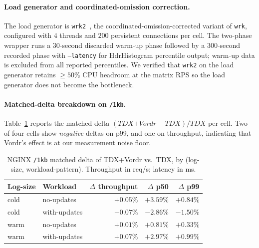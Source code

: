 \paragraph{Load generator and coordinated-omission correction.}
The load generator is \texttt{wrk2}~\cite{wrk2}, the
coordinated-omission-corrected variant of \texttt{wrk}, configured
with $4$ threads and $200$ persistent connections per cell. The
two-phase wrapper runs a $30$-second discarded warm-up phase followed
by a $300$-second recorded phase with \texttt{--latency} for HdrHistogram
percentile output; warm-up data is excluded from all reported
percentiles. We verified that \texttt{wrk2} on the load generator
retains $\geq{}50\%$ CPU headroom at the matrix RPS so the load
generator does not become the bottleneck.

\paragraph{Matched-delta breakdown on \texttt{/1kb}.}
Table~\ref{tab:nginx-matched} reports the matched-delta
$(\textit{TDX+Vordr} - \textit{TDX})/\textit{TDX}$ per cell. Two of
four cells show \emph{negative} deltas on p99, and one on throughput,
indicating that Vordr's effect is at our measurement noise floor.

\begin{table}[t]
\centering
\small
\caption{NGINX \texttt{/1kb} matched delta of TDX+Vordr vs.\ TDX, by
(log-size, workload-pattern). Throughput in req/s; latency in ms.}
\label{tab:nginx-matched}
\begin{tabular}{@{}llrrr@{}}
\toprule
Log-size & Workload & $\Delta$ throughput & $\Delta$ p50 & $\Delta$ p99 \\
\midrule
cold & no-updates       & $+0.05\%$  & $+3.59\%$  & $+0.84\%$  \\
cold & with-updates & $-0.07\%$  & $-2.86\%$  & $-1.50\%$  \\
warm & no-updates       & $+0.01\%$  & $+0.81\%$  & $+0.33\%$  \\
warm & with-updates & $+0.07\%$  & $+2.97\%$  & $+0.99\%$  \\
\bottomrule
\end{tabular}
\end{table}

